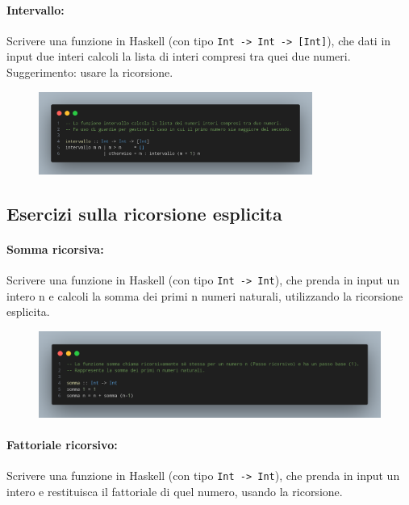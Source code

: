 \paragraph{Intervallo:} Scrivere una funzione in Haskell (con tipo \texttt{Int -> Int -> [Int]}), 
che dati in input due interi calcoli la lista di interi compresi tra quei due numeri. Suggerimento:
usare la ricorsione.

\begin{figure}[!h]
    \centering
    \includegraphics[width=0.8\textwidth]{images/Intervallo.png}
\end{figure}
\pagebreak
\subsection{Esercizi sulla ricorsione esplicita}

\paragraph{Somma ricorsiva:} Scrivere una funzione in Haskell (con tipo \texttt{Int -> Int}), 
che prenda in input un intero n e calcoli la somma dei primi n numeri naturali, utilizzando la ricorsione esplicita.

\begin{figure}[!h]
    \centering
    \includegraphics[width=1\textwidth]{images/Somma2.png}
\end{figure}

\paragraph{Fattoriale ricorsivo:} Scrivere una funzione in Haskell (con tipo \texttt{Int -> Int}),
che prenda in input un intero e restituisca il fattoriale di quel numero, usando la ricorsione.

